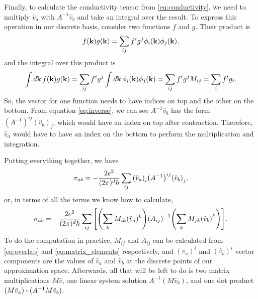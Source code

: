 \documentclass[12pt]{article}
\begin{document}
Finally, to calculate the conductivity tensor from \eqref{eq:conductivity}, we need to multiply
$\hat{v}_a$ with $A^{-1}\hat{v}_b$ and take an integral over the result. To express this operation
in our discrete basis, consider two functions $f$ and $g$. Their product is
\begin{equation}
    f(\vb{k})g(\vb{k}) = \sum_{ij} f^i g^j \phi_i(\vb{k}) \phi_j(\vb{k}),
\end{equation}
and the integral over this product is
\begin{equation}
    \int\dd{\vb{k}} f(\vb{k}) g(\vb{k}) = \sum_{ij} f^i g^j \int\dd{\vb{k}}
    \phi_i(\vb{k})\phi_j(\vb{k}) = \sum_{ij} f^i g^j M_{ij} = \sum_i f^i g_i.
\end{equation}
So, the vector for one function needs to have indices on top and the other on the bottom. From
equation \eqref{eq:inverse}, we can see $A^{-1}\hat{v}_b$ has the form
$(A^{-1})^{ij} (\hat{v}_b)_j$, which would have an index on top after contraction. Therefore,
$\hat{v}_a$ would have to have an index on the bottom to perform the multiplication and integration.

Putting everything together, we have
\begin{equation}
    \sigma_{ab} = -\frac{2e^2}{(2\pi)^d\hbar} \sum_{ij} \qty(\hat{v}_a)_i
    \qty(A^{-1})^{ij} \qty(\hat{v}_b)_j,
\end{equation}
or, in terms of all the terms we know how to calculate,
\begin{equation}
    \sigma_{ab} = -\frac{2e^2}{(2\pi)^d\hbar} \sum_{ij} \qty[
    \qty(\sum_k M_{ik} (\hat{v}_a)^k) \qty(A_{ij})^{-1} \qty(\sum_k M_{jk} \qty(\hat{v}_b)^k)].
\end{equation}
To do the computation in practice, $M_{ij}$ and $A_{ij}$ can be calculated from \eqref{eq:overlap}
and \eqref{eq:matrix_elements} respectively, and $(\hat{v}_a)^i$ and $(\hat{v}_b)^i$ vector
components are the values of $\hat{v}_a$ and $\hat{v}_b$ at the discrete points of our approximation
space.  Afterwards, all that will be left to do is two matrix multiplications $M\hat{v}$, one linear
system solution $A^{-1}(M\hat{v}_b)$, and one dot product $(M\hat{v}_a)\vdot(A^{-1}M\hat{v}_b)$.
\end{document}
